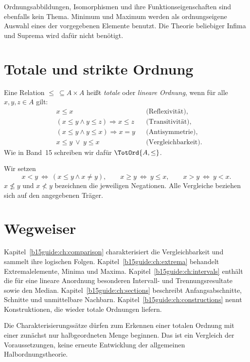 Ordnungsabbildungen, Isomorphismen und ihre Funktionseigenschaften
sind ebenfalls kein Thema. Minimum und Maximum werden als
ordnungseigene Auswahl eines der vorgegebenen Elemente benutzt.
Die Theorie beliebiger Infima und Suprema wird dafür nicht benötigt.

\section{Totale und strikte Ordnung}

\begin{definition}
\label{b15guide:def:linear}
Eine Relation $\leq\ \subseteq A\times A$ heißt
\emph{totale} oder \emph{lineare Ordnung}, wenn für alle
$x,y,z\in A$ gilt:
\[
\begin{aligned}
 &x\leq x &&\text{(Reflexivität)},\\
 &(x\leq y\land y\leq z)\Rightarrow x\leq z
     &&\text{(Transitivität)},\\
 &(x\leq y\land y\leq x)\Rightarrow x=y
     &&\text{(Antisymmetrie)},\\
 &x\leq y\ \lor\ y\leq x &&\text{(Vergleichbarkeit)}.
\end{aligned}
\]
Wie in Band~15 schreiben wir dafür $\TotOrd{A,\leq}$.
\end{definition}

\begin{definition}
Wir setzen
\[
 x<y\ \Longleftrightarrow\ (x\leq y\land x\ne y),
 \qquad x\geq y\ \Longleftrightarrow\ y\leq x,
 \qquad x>y\ \Longleftrightarrow\ y<x.
\]
$x\not\leq y$ und $x\not<y$ bezeichnen die jeweiligen
Negationen. Alle Vergleiche beziehen sich auf den angegebenen Träger.
\end{definition}

\section{Wegweiser}

Kapitel~\ref{b15guide:ch:comparison} charakterisiert die
Vergleichbarkeit und sammelt ihre logischen Folgen.
Kapitel~\ref{b15guide:ch:extrema} behandelt Extremalelemente,
Minima und Maxima.
Kapitel~\ref{b15guide:ch:intervals} enthält die für eine
lineare Anordnung besonderen Intervall- und Trennungsresultate sowie den Median.
Kapitel~\ref{b15guide:ch:sections} beschreibt Anfangsabschnitte,
Schnitte und unmittelbare Nachbarn.
Kapitel~\ref{b15guide:ch:constructions} nennt Konstruktionen,
die wieder totale Ordnungen liefern.

Die Charakterisierungssätze dürfen zum Erkennen einer totalen
Ordnung mit einer zunächst nur halbgeordneten Menge beginnen.
Das ist ein Vergleich der Voraussetzungen, keine erneute
Entwicklung der allgemeinen Halbordnungstheorie.
